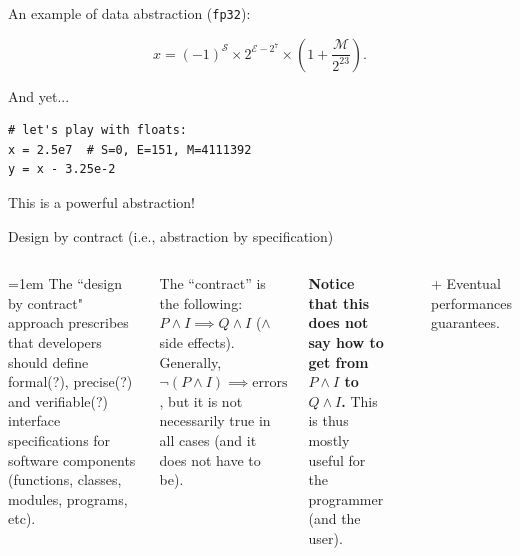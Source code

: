 \documentclass[10pt,
aspectratio=169
]{beamer}
\begin{document}
\begin{frame}[fragile]
	An example of data abstraction (\texttt{fp32}):
	\begin{center}
		\begin{equation*}
			x = (-1)^\mathcal{S} \times 2^{\mathcal{E}-2^7} \times \left(1+\frac{\mathcal M}{2^{23}}\right).
		\end{equation*}
	\end{center}
	And yet...
	\begin{verbatim}
# let's play with floats:
x = 2.5e7  # S=0, E=151, M=4111392
y = x - 3.25e-2
	\end{verbatim}
	This is a powerful abstraction!
\end{frame}

\begin{frame}{Design by contract (i.e., abstraction by specification)}
	\vspace*{1em}
	\begin{columns}
	\parskip=1em
	The ``design by contract" approach prescribes that developers should define formal(?), precise(?) and verifiable(?) interface specifications for software components (functions, classes, modules, programs, etc). 
	
	The ``contract'' is the following: $P \land I \implies Q \land I$ ($\land$ side effects). Generally, $\lnot (P \land I)\implies \text{errors}$, but it is not necessarily true in all cases (and it does not have to be). 
	
	\textbf{Notice that this does not say how to get from $P\land I$ to $Q\land I$.} This is thus mostly useful for the programmer (and the user).
	
	\begin{center}
	\end{center}
	\vspace*{1em}
	+ Eventual performances guarantees.
	\end{columns}
\end{frame}
\end{document}
